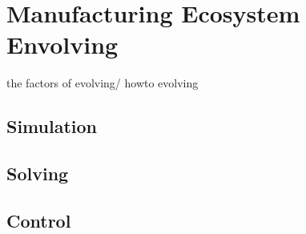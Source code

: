 \section{Manufacturing Ecosystem Envolving} %
\label{sec:envolve}
the factors of evolving/ howto evolving

\subsection{Simulation} %
\label{sub:simulation}


\subsection{Solving} %
\label{sub:solving}


\subsection{Control} %
\label{sub:control}

